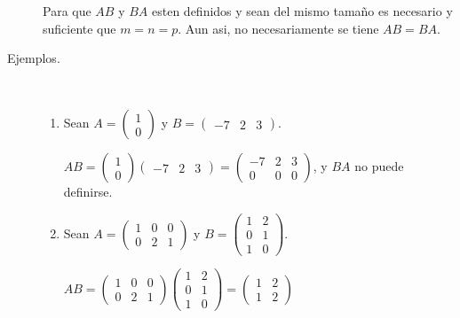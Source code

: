\documentclass[12pt]{article}
\begin{document}
\begin{description}
Para que $A B$ y  $B A$ esten definidos y sean del mismo tamaño es necesario y suficiente que $m = n = p$. Aun asi, no necesariamente se tiene $A B = B A$.

\item [Ejemplos.] \mbox{}\\

\begin{enumerate}
\item
Sean
\begin{math}
A =
\begin{pmatrix}
1 \\
0
\end{pmatrix}
\end{math}
 y 
 \begin{math}
B =
\begin{pmatrix}
-7 & 2 & 3
\end{pmatrix}
\end{math}.

\begin{math}
A B = 
\begin{pmatrix}
1 \\
0
\end{pmatrix}
\begin{pmatrix}
-7 & 2 & 3
\end{pmatrix}
=
\begin{pmatrix}
-7 & 2 & 3 \\
0 & 0 & 0
\end{pmatrix}
\end{math}, y $B A$ no puede definirse.

\item
Sean
\begin{math}
A =
\begin{pmatrix}
1 & 0 & 0 \\
0 & 2 & 1
\end{pmatrix}
\end{math}
 y 
 \begin{math}
B =
\begin{pmatrix}
1 & 2 \\
0 & 1 \\
1 & 0
\end{pmatrix}
\end{math}.

\begin{math}
A B = 
\begin{pmatrix}
1 & 0 & 0 \\
0 & 2 & 1
\end{pmatrix}
\begin{pmatrix}
1 & 2 \\
0 & 1 \\
1 & 0
\end{pmatrix}
=
\begin{pmatrix}
1 & 2 \\
1 & 2
\end{pmatrix}
\end{math}


\end{enumerate}
\end{description}
\end{document}
